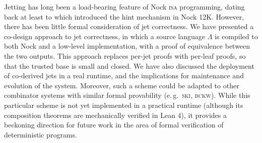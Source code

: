 \documentclass[twoside]{article}
\begin{document}
Jetting has long been a load-bearing feature of Nock \textsc{isa} programming, dating back at least to \citet{Nock12K} which introduced the hint mechanism in Nock 12K.  However, there has been little formal consideration of jet correctness.  We have presented a co-design approach to jet correctness, in which a source language $\Lambda$ is compiled to both Nock and a low-level implementation, with a proof of equivalence between the two outputs.  This approach replaces per-jet proofs with per-leaf proofs, so that the trusted base is small and closed.  We have also discussed the deployment of co-derived jets in a real runtime, and the implications for maintenance and evolution of the system.  Moreover, such a scheme could be adapted to other combinator systems with similar formal provability (e.\,g.\ \textsc{ski}, \textsc{bckw}).  While this particular scheme is not yet implemented in a practical runtime (although its composition theorems are mechanically verified in Lean 4), it provides a beckoning direction for future work in the area of formal verification of deterministic programs.\tombstone

\printbibliography
\end{document}
